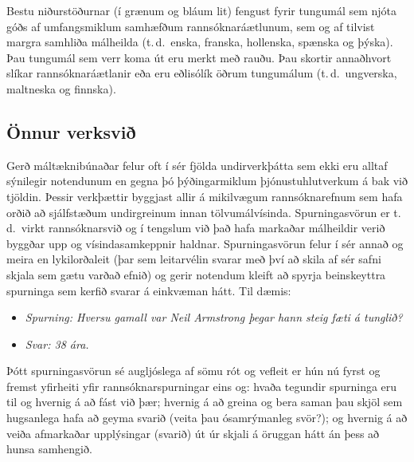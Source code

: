 \begin{multicols}{2}
Bestu niðurstöðurnar (í grænum og bláum lit) fengust fyrir tungumál sem njóta góðs af umfangsmiklum samhæfðum rannsóknaráætlunum, sem og af tilvist margra samhliða málheilda (t.\,d.~enska, franska, hollenska, spænska og þýska). Þau tungumál sem verr koma út eru merkt með rauðu. Þau skortir annaðhvort slíkar rannsóknaráætlanir eða eru eðlisólík öðrum tungumálum (t.\,d.~ungverska, maltneska og finnska).

\subsection{Önnur verksvið}

Gerð máltæknibúnaðar felur oft í sér fjölda undirverkþátta sem ekki eru alltaf sýnilegir notendunum en gegna þó þýðingarmiklum þjónustuhlutverkum á bak við tjöldin. Þessir verkþættir byggjast allir á mikilvægum rannsóknarefnum sem hafa orðið að sjálfstæðum undirgreinum innan tölvumálvísinda.
Spurningasvörun er t.\,d.~virkt rannsóknarsvið og í tengslum við það hafa markaðar málheildir verið byggðar upp og vísindasamkeppnir haldnar. 
Spurningasvörun felur í sér annað og meira en lykilorðaleit (þar sem leitarvélin svarar með því að skila af sér safni skjala sem gætu varðað efnið) og gerir notendum kleift að spyrja beinskeyttra spurninga sem kerfið svarar á einkvæman hátt. Til dæmis:
		
\begin{itemize}
\item[] \textit{Spurning: Hversu gamall var Neil Armstrong þegar hann steig fæti á tunglið?}
\item[] \textit{Svar: 38 ára.}
\end{itemize}

Þótt spurningasvörun sé augljóslega af sömu rót og vefleit er hún nú fyrst og fremst yfirheiti yfir rannsóknarspurningar eins og: hvaða tegundir spurninga eru til og hvernig á að fást við þær; hvernig á að greina og bera saman þau skjöl sem hugsanlega hafa að geyma svarið (veita þau ósamrýmanleg svör?); og hvernig á að veiða afmarkaðar upplýsingar (svarið) út úr skjali á öruggan hátt án þess að hunsa samhengið.


\end{multicols}
